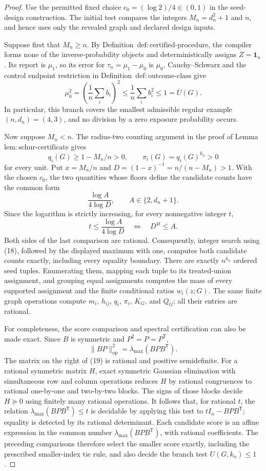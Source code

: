 \documentclass{article}
\begin{document}
\begin{proof}
Use the permitted fixed choice \(c_0=(\log 2)/4\in(0,1)\) in the
seed-design construction.
The initial test compares the integers \(M_n=d_n^2+1\) and \(n\), and hence
uses only the revealed graph and declared design inputs.

Suppose first that \(M_n\ge n\).  By
Definition~\(\mathrm{def{:}certified\mbox{-}procedure}\), the compiler forms
none of the inverse-probability objects and deterministically assigns
\(Z=\mathbf 1_n\).  Its report is \(\mu_1\), so its error for
\(\tau_n=\mu_1-\mu_0\) is \(\mu_0\).  Cauchy--Schwarz and the control
endpoint restriction in Definition~\(\mathrm{def{:}outcome\mbox{-}class}\)
give
\[
\mu_0^2
=\left(\frac1n\sum_i b_i\right)^2
\le\frac1n\sum_i b_i^2
\le1=\overline U(G).
\tag{16}
\]
In particular, this branch covers the smallest admissible regular example
\((n,d_n)=(4,3)\), and no division by a zero exposure probability occurs.

Now suppose \(M_n<n\).  The radius-two counting argument in the proof of
Lemma~\(\mathrm{lem{:}schur\mbox{-}certificate}\) gives
\[
q_i(G)\ge1-M_n/n>0,
\qquad
\pi_i(G)=q_i(G)^{k_n}>0
\tag{17}
\]
for every unit.  Put \(x=M_n/n\) and
\(D=(1-x)^{-1}=n/(n-M_n)>1\).  With the chosen \(c_0\), the two quantities
whose floors define the candidate counts have the common form
\[
\frac{\log A}{4\log D},
\qquad A\in\{2,d_n+1\}.
\]
Since the logarithm is strictly increasing, for every nonnegative integer
\(t\),
\[
t\le\frac{\log A}{4\log D}
\quad\Longleftrightarrow\quad
D^{4t}\le A.
\tag{18}
\]
Both sides of the last comparison are rational.  Consequently, integer
search using (18), followed by the displayed maximum with one, computes
both candidate counts exactly, including every equality boundary.  There
are exactly \(n^{k_n}\) ordered seed tuples.  Enumerating them, mapping each
tuple to its treated-union assignment, and grouping equal assignments
computes the mass of every supported assignment and the finite conditional
ratios \(w_i(z;G)\).
The same finite graph operations compute \(m_i\), \(h_{ij}\), \(q_i\),
\(\pi_i\), \(K_G\), and \(Q_G\); all their entries are rational.

For completeness, the score comparison and spectral certification can also
be made exact.  Since \(B\) is symmetric and \(P^2=P=P^{\mathsf T}\),
\[
\|BP\|_{\mathrm{op}}^2
=\lambda_{\max}(BPB^{\mathsf T}).
\tag{19}
\]
The matrix on the right of (19) is rational and positive semidefinite.  For
a rational symmetric matrix \(H\), exact symmetric Gaussian elimination
with simultaneous row and column operations reduces \(H\) by rational
congruences to rational one-by-one and two-by-two blocks.  The signs of
those blocks decide \(H\succeq0\) using finitely many rational operations.
It follows that, for rational \(t\), the relation
\(\lambda_{\max}(BPB^{\mathsf T})\le t\) is decidable by applying this test
to \(tI_n-BPB^{\mathsf T}\); equality is detected by its rational
determinant.  Each candidate score is an affine expression in the common
number \(\lambda_{\max}(BPB^{\mathsf T})\), with rational coefficients.
The preceding comparisons therefore select the smaller score exactly,
including the prescribed smaller-index tie rule, and also decide the branch
test \(U(G,k_n)\le1\).


\end{proof}
\end{document}
